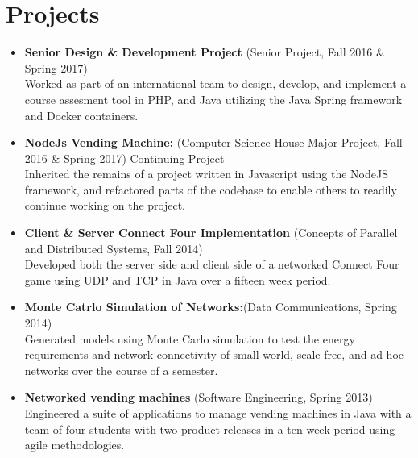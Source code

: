 \documentclass[10pt]{Article}
\begin{document}
\section*{Projects}
\begin{itemize}[topsep=1ex, itemsep=.5ex, parsep=0ex, partopsep=.75ex]
	\item[]{\bf Senior Design \& Development Project} (Senior Project, Fall 2016 \& Spring 2017)\\
	Worked as part of an international team to design, develop, and implement a course assesment tool in PHP, and Java utilizing the Java Spring framework and Docker containers.
	\item[]{\bf NodeJs Vending Machine:} (Computer Science House Major Project, Fall 2016 \& Spring 2017) Continuing Project\\
	Inherited the remains of a project written in Javascript using the NodeJS framework, and refactored parts of the codebase to enable others to readily continue working on the project.
	\item[]{\bf Client \& Server Connect Four Implementation} (Concepts of Parallel and Distributed Systems, Fall 2014)\\
  Developed both the server side and client side of a networked Connect Four game using UDP and TCP in Java over a fifteen week period.
	\item[]{\bf Monte Catrlo Simulation of Networks:}(Data Communications, Spring 2014)\\
	Generated models using Monte Carlo simulation to test the energy requirements and network connectivity of small world, scale free, and ad hoc networks over the course of a semester.
	\item[]{\bf Networked vending machines} (Software Engineering, Spring 2013)\\
	Engineered a suite of applications to manage vending machines in Java with a team of four students with two product releases in a ten week period using agile methodologies.
\end{itemize}
\end{document}
